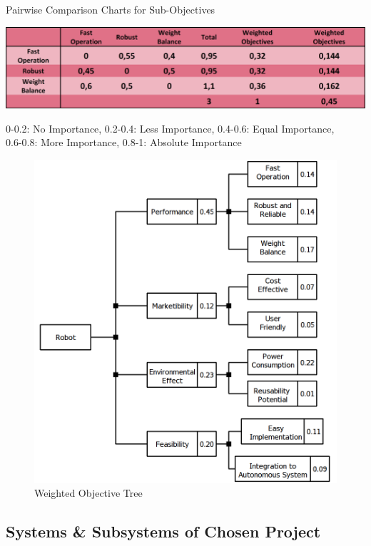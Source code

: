 \documentclass[a4paper,12pt]{article}
\begin{document}
	
	\begin{table}[H]
		\centering
		\caption{\label{tab:sub_project_objective_tree}Pairwise Comparison Charts for Sub-Objectives}\vspace{-.2cm}
		\includegraphics[width=\textwidth,height=\textheight,keepaspectratio]{images/proje_objective_tree_2a} 
	\vspace*{-.9cm}	\begin{center}
		{\small 0-0.2: No Importance, 0.2-0.4: Less Importance, 0.4-0.6: Equal Importance,\\ 0.6-0.8: More Importance, 0.8-1: Absolute Importance }	
		\end{center}
	\end{table}	\vspace*{-.5cm}
	
	\begin{figure}[H]
		\centering
		\includegraphics[width=.7\textwidth,center]{objective-tree/objective-tree} 
		\caption{\label{fig:product_tree}Weighted Objective Tree}
	\end{figure}
	
	
	
	\subsection{Systems \& Subsystems of Chosen Project}
		
\end{document}
